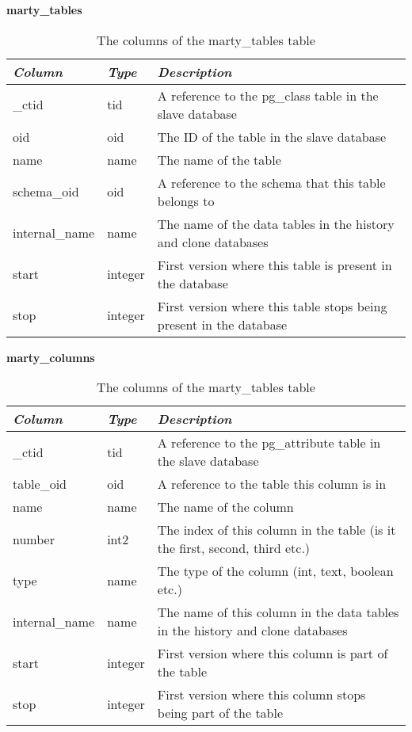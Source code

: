 \begin{table}[h]
  \centering
  \textbf{marty\_tables}
  \begin{tabularx}{\textwidth}{llX}
    \textit{Column} & \textit{Type} & \textit{Description} \\
    \midrule
    \_ctid & tid & A reference to the pg\_class table in the slave database \\
    oid & oid & The ID of the table in the slave database \\
    name & name & The name of the table \\
    schema\_oid & oid & A reference to the schema that this table belongs to \\
    internal\_name & name & The name of the data tables in the history and clone databases \\
    start & integer & First version where this table is present in the database \\
    stop & integer & First version where this table stops being present in the database \\
  \end{tabularx}
  \caption{The columns of the marty\_tables table}
  \label{table:marty-tables}
\end{table}

\begin{table}[h]
  \centering
  \textbf{marty\_columns}
  \begin{tabularx}{\textwidth}{llX}
    \textit{Column} & \textit{Type} & \textit{Description} \\
    \midrule
    \_ctid & tid & A reference to the pg\_attribute table in the slave database \\
    table\_oid & oid & A reference to the table this column is in \\
    name & name & The name of the column \\
    number & int2 & The index of this column in the table (is it the first, second, third etc.) \\
    type & name & The type of the column (int, text, boolean etc.) \\
    internal\_name & name & The name of this column in the data tables in the history and clone databases \\
    start & integer & First version where this column is part of the table \\
    stop & integer & First version where this column stops being part of the table \\
  \end{tabularx}
  \caption{The columns of the marty\_tables table}
  \label{table:marty-columns}
\end{table}

